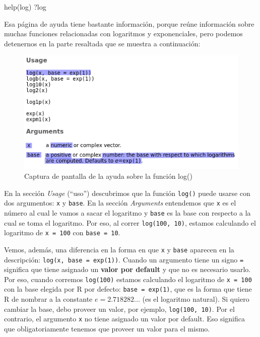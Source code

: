 \documentclass[
]{book}
\newenvironment{Shaded}{\begin{snugshade}}{\end{snugshade}}
\newcommand{\FunctionTok}[1]{\textcolor[rgb]{0.00,0.00,0.00}{#1}}
\newcommand{\NormalTok}[1]{#1}
\begin{document}
\begin{Shaded}
\begin{Highlighting}[]
\FunctionTok{help}\NormalTok{(log)}
\NormalTok{?log}
\end{Highlighting}
\end{Shaded}

Esa página de ayuda tiene bastante información, porque reúne información sobre muchas funciones relacionadas con logaritmos y exponenciales, pero podemos detenernos en la parte resaltada que se muestra a continuación:

\begin{figure}

{\centering \includegraphics[width=0.7\linewidth]{images/03_funciones/ayuda} 

}

\caption{Captura de pantalla de la ayuda sobre la función log()}\label{fig:unnamed-chunk-73}
\end{figure}

En la sección \emph{Usage} (``uso'') descubrimos que la función \texttt{log()} puede usarse con dos argumentos: \texttt{x} y \texttt{base}. En la sección \emph{Arguments} entendemos que \texttt{x} es el número al cual le vamos a sacar el logaritmo y \texttt{base} es la base con respecto a la cual se toma el logaritmo. Por eso, al correr \texttt{log(100,\ 10)}, estamos calculando el logaritmo de \texttt{x\ =\ 100} con \texttt{base\ =\ 10}.

Vemos, además, una diferencia en la forma en que \texttt{x} y \texttt{base} aparecen en la descripción: \texttt{log(x,\ base\ =\ exp(1))}. Cuando un argumento tiene un signo \texttt{=} significa que tiene asignado un \textbf{valor por default} y que no es necesario usarlo. Por eso, cuando corremos \texttt{log(100)} estamos calculando el logaritmo de \texttt{x\ =\ 100} con la base elegida por R por defecto: \texttt{base\ =\ exp(1)}, que es la forma que tiene R de nombrar a la constante \(e = 2.718282...\) (es el logaritmo natural). Si quiero cambiar la base, debo proveer un valor, por ejemplo, \texttt{log(100,\ 10)}. Por el contrario, el argumento \texttt{x} no tiene asignado un valor por default. Eso significa que obligatoriamente tenemos que proveer un valor para el mismo.
\end{document}
